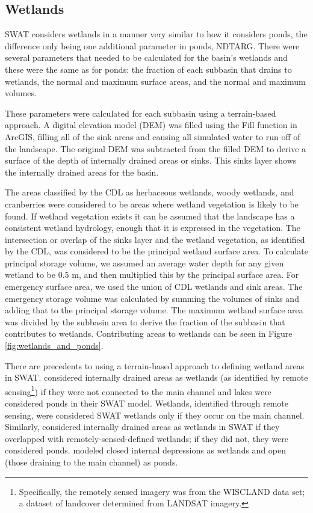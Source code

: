 \subsection{Wetlands}\label{sec:wetlands}

	SWAT considers wetlands in a manner very similar to how it considers ponds, the difference only being one additional parameter in ponds, NDTARG. There were several parameters that needed to be calculated for the basin's wetlands and these were the same as for ponds: the fraction of each subbasin that drains to wetlands, the normal and maximum surface areas, and the normal and maximum volumes. 
	
	These parameters were calculated for each subbasin using a terrain-based approach. A digital elevation model (DEM) was filled using the Fill function in ArcGIS, filling all of the sink areas and causing all simulated water to run off of the landscape. The original DEM was subtracted from the filled DEM to derive a surface of the depth of internally drained areas or sinks.  This sinks layer shows the internally drained areas for the basin.
	
	The areas classified by the CDL as herbaceous wetlands, woody wetlands, and cranberries were considered to be areas where wetland vegetation is likely to be found. If wetland vegetation exists it can be assumed that the landscape has a consistent wetland hydrology, enough that it is expressed in the vegetation. The intersection or overlap of the sinks layer and the wetland vegetation, as identified by the CDL, was considered to be the principal wetland surface area. To calculate principal storage volume, we assumed an average water depth for any given wetland to be 0.5 m, and then multiplied this by the principal surface area. For emergency surface area, we used the union of CDL wetlands and sink areas. The emergency storage volume was calculated by summing the volumes of sinks and adding that to the principal storage volume. The maximum wetland surface area was divided by the subbasin area to derive the fraction of the subbasin that contributes to wetlands. Contributing areas to wetlands can be seen in Figure \ref{fig:wetlands_and_ponds}.

	There are precedents to using a terrain-based approach to defining wetland areas in SWAT. \citet{almendinger_constructing_2007} considered internally drained areas as wetlands (as identified by remote sensing\footnote{Specifically, the remotely sensed imagery was from the WISCLAND data set; a dataset of landcover determined from LANDSAT imagery.}) if they were not connected to the main channel and lakes were considered ponds in their SWAT model. Wetlands, identified through remote sensing, were considered SWAT wetlands only if they occur on the main channel. Similarly, \citet{kirsch_predicting_2002} considered internally drained areas as wetlands in SWAT if they overlapped with remotely-sensed-defined wetlands; if they did not, they were considered ponds.  \citet{almendinger_constructing_2010} modeled closed internal depressions as wetlands and open (those draining to the main channel) as ponds.



